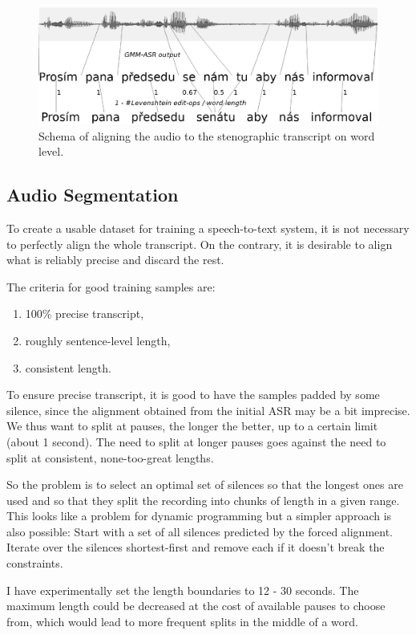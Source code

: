 \documentclass[runningheads]{llncs}
\begin{document}
\begin{figure}[htpb]
\includegraphics[scale=0.4]{rc/align.eps}
\caption{Schema of aligning the audio to the stenographic transcript on word
level.}
\label{fig:align}
\end{figure}

\subsection{Audio Segmentation}

To create a usable dataset for training a speech-to-text system, it is not
necessary to perfectly align the whole transcript. On the contrary, it is
desirable to align what is reliably precise and discard the rest.

The criteria for good training samples are:
\begin{enumerate}
\item{100\% precise transcript,}
\item{roughly sentence-level length,}
\item{consistent length.}
\end{enumerate}

To ensure precise transcript, it is good to have the samples padded by some
silence, since the alignment obtained from the initial ASR may be a bit
imprecise. We thus want to split at pauses, the longer the better, up to a
certain limit (about 1 second). The need to split at longer
pauses goes against the need to split at consistent, none-too-great lengths.

So the problem is to select an optimal set of silences so that the longest ones
are used and so that they split the recording into chunks of length in a given
range. This looks like a problem for dynamic programming but a simpler approach
is also possible: Start with a set of all silences predicted by the forced
alignment.  Iterate over the silences shortest-first and remove each if it
doesn't break the constraints.

I have experimentally set the length boundaries to 12 - 30 seconds. The maximum
length could be decreased at the cost of available pauses to choose from, which
would lead to more frequent splits in the middle of a word.
\end{document}
